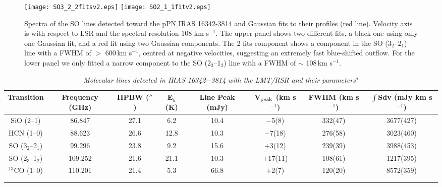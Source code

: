 \documentclass[a4paper,fleqn,usenatbib]{mnras}
\begin{document}
\begin{figure}
\vbox{
\centering
\texttt{[image: SO3\_2\_2fitsv2.eps]}
\texttt{[image: SO2\_1\_1fitv2.eps]} }
\caption{Spectra of the SO lines detected toward the pPN IRAS 16342-3814 and Gaussian fits to their profiles (red line). Velocity axis is with respect to LSR and the spectral resolution 108 km s$^{-1}$. The upper panel shows two different fits, a black one using only one Gaussian fit, and a red fit using two Gaussian components. 
The 2 fits component shows a component in the SO (3$_2$--2$_1$) line with a FWHM of $>$ 600\,km s$^{-1}$, centred at negative velocities, suggesting an extremely fast blue-shifted outflow. For the lower panel we only fitted a narrow component to the SO (2$_3$--1$_2$) line with a FWHM of $\sim$ 108\,km s$^{-1}$.}
\label{SO-2comp}
\end{figure}


\begin{table*}
\begin{center}
\caption{\em{Molecular lines detected in IRAS 16342$-$3814 with the LMT/RSR and their parameters$^{a}$}}
\begin{tabular}{cccccccc}
\hline \noalign {\smallskip}
Transition & Frequency (GHz) &   HPBW ($''$)  & E$_u$ (K)  &  Line Peak (mJy) & V$_{\rm peak}$ (km s$^{-1}$) & FWHM (km s$^{-1}$)  & $\int$Sdv (mJy km s$^{-1}$)\\
\hline \noalign {\smallskip}
SiO (2--1)        & 86.847  & 27.1 & 6.2   & 10.4  & $-$5(8)& 332(47) & 3677(427)\\
HCN (1--0)        & 88.623  & 26.6 & 12.8  & 10.3  & $-$7(18) & 276(58) & 3023(460)\\
SO (3$_2$--2$_1$) & 99.296  & 23.8 & 9.2   & 15.6  & $+$3(12) & 239(39)  & 3988(453)\\
SO (2$_3$--1$_2$) & 109.252 & 21.6 & 21.1  & 10.3 &  $+$17(11)   & 108(61)  & 1217(395)\\
$^{13}$CO (1--0)  & 110.201 & 21.4 & 5.3   & 66.8 & $+$2(7) & 120(20) & 8572(359)\\
\hline \noalign {\smallskip}
\multicolumn{7}{l}{$a$: Line parameters from Gaussian fits; errors indicated in brackets.}\\
\label{tab:lines}
\end{tabular}
\end{center}
\end{table*}
\end{document}
